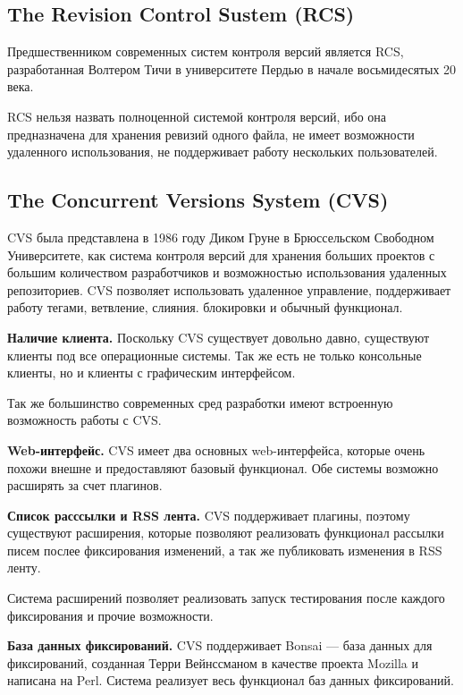 \subsection{ The Revision Control Sustem (RCS) } \label{sect2_4_1}
 
 Предшественником современных систем контроля версий является RCS, разработанная Волтером Тичи в университете Пердью в начале восьмидесятых 20 века.
 
 RCS нельзя назвать полноценной системой контроля версий, ибо она предназначена для хранения ревизий одного файла, не имеет возможности удаленного использования, не поддерживает работу нескольких пользователей.
 
\subsection{ The Concurrent Versions System (CVS) } \label{sect2_4_2}

CVS была представлена в 1986 году Диком Груне в Брюссельском Свободном Университете, как система контроля версий для хранения больших проектов с большим количеством разработчиков и возможностью использования удаленных репозиториев.  CVS позволяет использовать удаленное управление, поддерживает работу  тегами, ветвление, слияния. блокировки и обычный функционал.

\textbf{Наличие клиента.} Поскольку CVS существует довольно давно, существуют клиенты под все операционные системы. Так же есть не только консольные клиенты, но и клиенты с графическим интерфейсом.

Так же большинство современных сред разработки имеют встроенную возможность работы с CVS.

\textbf{Web-интерфейс.} CVS имеет два основных web-интерфейса, которые очень похожи внешне и предоставляют базовый функционал. Обе системы возможно расширять за счет плагинов.

\textbf{Список расссылки и RSS лента.} CVS поддерживает плагины, поэтому существуют расширения,  которые позволяют реализовать функционал рассылки писем послее фиксирования изменений, а так же публиковать изменения в RSS ленту.

Система расширений позволяет реализовать запуск тестирования после каждого фиксирования и прочие возможности.

\textbf{База данных фиксирований.} CVS поддерживает Bonsai --- база данных для фиксирований, созданная Терри Вейнссманом в качестве проекта Mozilla и написана на Perl. Система реализует весь функционал баз данных фиксирований.


